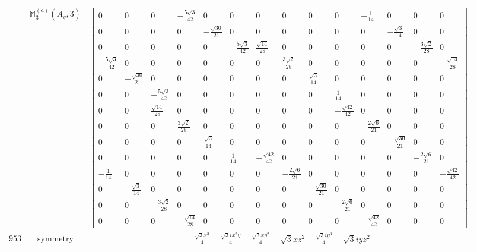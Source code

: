 \documentclass[fleqn,8pt,landscape]{jsarticle}
\begin{document}
\begin{longtable}{ccc}
$  $ & $ \mathbb{M}_{3}^{(a)}(A_{g},3) $ & $ \begin{bmatrix} 0 & 0 & 0 & - \frac{5 \sqrt{3}}{42} & 0 & 0 & 0 & 0 & 0 & 0 & - \frac{1}{14} & 0 & 0 & 0 \\ 0 & 0 & 0 & 0 & - \frac{\sqrt{30}}{21} & 0 & 0 & 0 & 0 & 0 & 0 & - \frac{\sqrt{3}}{14} & 0 & 0 \\ 0 & 0 & 0 & 0 & 0 & - \frac{5 \sqrt{3}}{42} & \frac{\sqrt{14}}{28} & 0 & 0 & 0 & 0 & 0 & - \frac{3 \sqrt{2}}{28} & 0 \\ - \frac{5 \sqrt{3}}{42} & 0 & 0 & 0 & 0 & 0 & 0 & \frac{3 \sqrt{2}}{28} & 0 & 0 & 0 & 0 & 0 & - \frac{\sqrt{14}}{28} \\ 0 & - \frac{\sqrt{30}}{21} & 0 & 0 & 0 & 0 & 0 & 0 & \frac{\sqrt{3}}{14} & 0 & 0 & 0 & 0 & 0 \\ 0 & 0 & - \frac{5 \sqrt{3}}{42} & 0 & 0 & 0 & 0 & 0 & 0 & \frac{1}{14} & 0 & 0 & 0 & 0 \\ 0 & 0 & \frac{\sqrt{14}}{28} & 0 & 0 & 0 & 0 & 0 & 0 & - \frac{\sqrt{42}}{42} & 0 & 0 & 0 & 0 \\ 0 & 0 & 0 & \frac{3 \sqrt{2}}{28} & 0 & 0 & 0 & 0 & 0 & 0 & - \frac{2 \sqrt{6}}{21} & 0 & 0 & 0 \\ 0 & 0 & 0 & 0 & \frac{\sqrt{3}}{14} & 0 & 0 & 0 & 0 & 0 & 0 & - \frac{\sqrt{30}}{21} & 0 & 0 \\ 0 & 0 & 0 & 0 & 0 & \frac{1}{14} & - \frac{\sqrt{42}}{42} & 0 & 0 & 0 & 0 & 0 & - \frac{2 \sqrt{6}}{21} & 0 \\ - \frac{1}{14} & 0 & 0 & 0 & 0 & 0 & 0 & - \frac{2 \sqrt{6}}{21} & 0 & 0 & 0 & 0 & 0 & - \frac{\sqrt{42}}{42} \\ 0 & - \frac{\sqrt{3}}{14} & 0 & 0 & 0 & 0 & 0 & 0 & - \frac{\sqrt{30}}{21} & 0 & 0 & 0 & 0 & 0 \\ 0 & 0 & - \frac{3 \sqrt{2}}{28} & 0 & 0 & 0 & 0 & 0 & 0 & - \frac{2 \sqrt{6}}{21} & 0 & 0 & 0 & 0 \\ 0 & 0 & 0 & - \frac{\sqrt{14}}{28} & 0 & 0 & 0 & 0 & 0 & 0 & - \frac{\sqrt{42}}{42} & 0 & 0 & 0 \end{bmatrix} $ \\ \hline
$ 953 $ & $ \text{symmetry} $ & $ - \frac{\sqrt{3} x^{3}}{4} - \frac{\sqrt{3} i x^{2} y}{4} - \frac{\sqrt{3} x y^{2}}{4} + \sqrt{3} x z^{2} - \frac{\sqrt{3} i y^{3}}{4} + \sqrt{3} i y z^{2} $ \\

\end{longtable}
\end{document}
